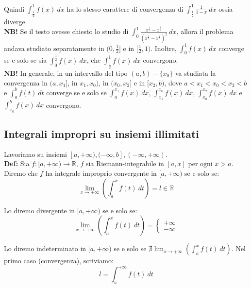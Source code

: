 \documentclass{article}
\begin{document}
\noindent Quindi $\int_\frac{1}{2}^1 f(x) \ dx$ ha lo stesso carattere di convergenza di $\int_\frac{1}{2}^1 \frac{1}{1 - x} \ dx$ ossia diverge.\\

\noindent\textbf{NB!} Se il testo avesse chiesto lo studio di $\int_0^1 \frac{x^{\frac{1}{3}} - x^{\frac{1}{2}}}{(x^{\frac{1}{2}} - x^{\frac{2}{3}})^2} \ dx$, allora il problema andava studiato separatamente in $(0, \frac{1}{2}]$ e in $[\frac{1}{2}, 1)$. Inoltre, $\int_0^1 f(x) \ dx$ converge se e solo se sia $\int_0^\frac{1}{2} f(x) \ dx$, che $\int_\frac{1}{2}^1 f(x) \ dx$ convergono. \\

\noindent\textbf{NB!} In generale, in un intervallo del tipo $(a, b) - \{x_0\}$ va studiata la convergenza in $(a, x_1]$, in $x_1, x_0)$, in $(x_0, x_2]$ e in $[x_2, b)$, dove $a < x_1 < x_0 < x_2 < b$ e $\int_a^b f(t) \ dt$ converge se e solo se $\int_a^{x_1} f(x) \ dx$, $\int_{x_1}^{x_0} f(x) \ dx$, $\int_{x_0}^{x_2} f(x) \ dx$ e $\int_{x_0}^b f(x) \ dx$ convergono.

\subsection{Integrali impropri su insiemi illimitati}
Lavoriamo su insiemi $[a, +\infty), (-\infty, b], (-\infty, +\infty)$. \\

\noindent\textbf{Def:} Sia $f: [a, +\infty) \xrightarrow{} \mathbb{R}$, $f$ sia Riemann-integrabile in $[a, x]$ per ogni $x > a$. Diremo che $f$ ha integrale improprio convergente in $[a, +\infty)$ se e solo se: 
\begin{equation*}
    \lim_{x \to +\infty} \left(\int_a^x f(t) \ dt \right) = l \in \mathbb{R}
\end{equation*}

\noindent Lo diremo divergente in $[a, +\infty)$ se e solo se:
\begin{equation*}
    \lim_{x \to +\infty} \left(\int_a^x f(t) \ dt\right) = \begin{cases}
        +\infty \\ 
        -\infty
    \end{cases}
\end{equation*}

\noindent Lo diremo indeterminato in $[a, +\infty)$ se e solo se $\nexists \lim_{x \to +\infty} (\int_a^x f(t) \ dt)$. Nel primo caso (convergenza), scriviamo: 
\begin{equation*}
    l = \int_a^{+\infty} f(t) \ dt
\end{equation*}
\end{document}
